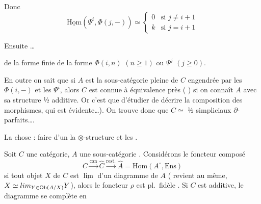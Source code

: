 \documentclass[11pt,a4paper]{article}
\begin{document}

Donc
\[
\underline{\mathrm{Hom}}(\Psi^{i}, \Phi(j,-)) \simeq
\begin{cases}
0 & \text{si } j \neq i+1 \\
k & \text{si } j = i+1
\end{cases}
\]

Ensuite \ill{}  \ldots

\ill{}  \ill{} \ill{} \ill{} de la forme finie  de la forme
$\Phi(i,n)$ $(n \geq 1)$ ou $\Psi^{j}$ $(j \geq 0)$.

En outre on sait que si $A$ est la sous-catégorie pleine de $C$ engendrée par les $\Phi(i,-)$ et les
$\Psi^{i}$, alors $C$ est connue à équivalence près ( \ill{} \ill{} \ill{}) si on connaît $A$
avec sa structure ½ additive. Or c'est  que  d'étudier  de
décrire la composition des morphismes, qui est évidente\ldots).
On trouve donc que $C \simeq$  ½ simpliciaux  \ill{} \ill{}
$\partial$-parfaits\ldots.

La chose  : faire \ill{} d'un \ill{} la $\otimes$-structure et les
 .

Soit $C$ une catégorie, $A$ une sous-catégorie .
Considérons le foncteur composé
\[
C \xrightarrow{\text{can}} \widehat{C} \xrightarrow{\text{rest.}} \widehat{A} =
\underline{\mathrm{Hom}}(A^{\circ}, \mathrm{Ens})
\]
si \struck{\ill{}} tout objet $X$ de $C$ est $\underline{\lim}$  \struck{\ill{}} d'un diagramme de $A$
( revient au même, $X \simeq \varinjlim_{Y \in \mathrm{Ob}(A/X)} Y$), alors le foncteur $\rho$ est pl.\ fidèle . Si $C$ est additive, le diagramme  se complète en
\end{document}

